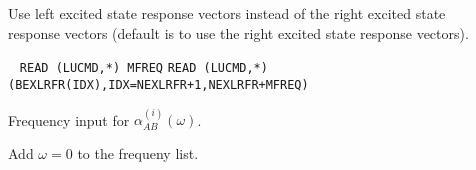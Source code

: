 \begin{description}
\item[] 
Use left excited state response vectors instead of the right excited
state response vectors (default is to use the right excited state
response vectors).
 
\item[]  \verb| |\newline
\verb|READ (LUCMD,*) MFREQ|\newline
\verb|READ (LUCMD,*) (BEXLRFR(IDX),IDX=NEXLRFR+1,NEXLRFR+MFREQ)|

Frequency input for $\alpha^{(i)}_{AB}(\omega)$.
 
\item[] 
Add $\omega = 0$ to the frequeny list.
 
\end{description}
